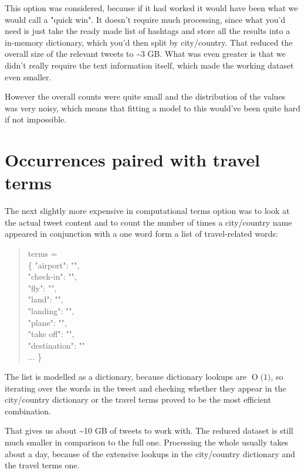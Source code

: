 \documentclass[minf,frontabs,twoside,singlespacing,parskip]{infthesis}
\newcommand{\BigO}[1]{\ensuremath{\operatorname{O}\bigl(#1\bigr)}}
\begin{document}
This option was considered, because if it had worked it would have been what we would call a "quick win". It doesn't require much processing, since what you'd need is just take the ready made list of hashtags and store all the results into a in-memory dictionary, which you'd then split by city/country. That reduced the overall size of the relevant tweets to \textasciitilde 3 GB. What was even greater is that we didn't really require the text information itself, which made the working dataset even smaller. 

However the overall counts were quite small and the distribution of the values was very noisy, which means that fitting a model to this would've been quite hard if not impossible.

\section{Occurrences paired with travel terms} 
\label{sec:tweettext}

The next slightly more expensive in computational terms option was to look at the actual tweet content and to count the number of times a city/country name appeared in conjunction with a one word form a list of travel-related words:

\begin{quotation}
terms = \\
\{ "airport": "", \\
"check-in": "", \\
"fly": "", \\
"land": "", \\ 
"landing": "", \\
"plane": "", \\ 
"take off": "", \\
"destination": "" \\
... \}
\end{quotation}

The list is modelled as a dictionary, because dictionary lookups are \BigO{1}, so iterating over the words in the tweet and checking whether they appear in the city/country dictionary or the travel terms proved to be the most efficient combination.

That gives us about  \textasciitilde  10 GB of tweets to work with. The reduced dataset is still much smaller in comparison to the full one. Processing the whole usually takes about a day, because of the extensive lookups in the city/country dictionary and the travel terms one.
\end{document}
